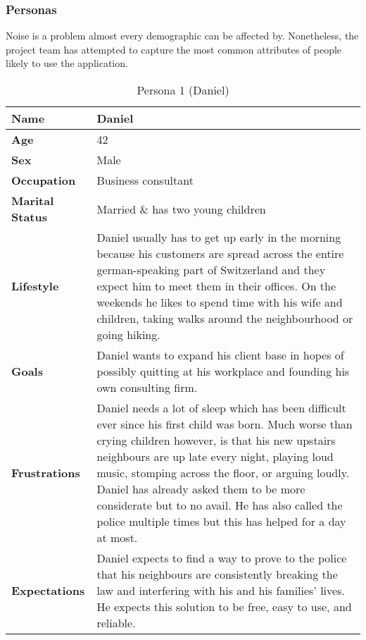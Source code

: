 \subsubsection{Personas}
\label{subsubsec:personas}
Noise is a problem almost every demographic can be affected by. Nonetheless, the project team has attempted to capture the most common attributes of people
likely to use the application. \\
\begin{table}
    \centering
    \begin{tabularx}{\textwidth}{|l|X|}
        \hline
        \textbf{Name} & Daniel \\
        \hline
        \textbf{Age} & 42 \\
        \hline
        \textbf{Sex} & Male \\
        \hline
        \textbf{Occupation} & Business consultant \\
        \hline
        \textbf{Marital Status} & Married \& has two young children \\
        \hline
        \textbf{Lifestyle} & Daniel usually has to get up early in the morning because his
        customers are spread across the entire german-speaking part of Switzerland and they expect him to meet them in their offices.
        On the weekends he likes to spend time with his wife and children, taking walks around the neighbourhood or going hiking. \\
        \hline
        \textbf{Goals} & Daniel wants to expand his client base in hopes of possibly quitting at his workplace and founding his own consulting firm. \\
        \hline
        \textbf{Frustrations} & Daniel needs a lot of sleep which has been difficult ever since his first child was born.
        Much worse than crying children however, is that his new upstairs neighbours are up late every night, playing loud music,
        stomping across the floor, or arguing loudly. Daniel has already asked them to be more considerate but to no avail. He has also
        called the police multiple times but this has helped for a day at most. \\
        \hline
        \textbf{Expectations} & Daniel expects to find a way to prove to the police that his neighbours are consistently
        breaking the law and interfering with his and his families' lives. He expects this solution to be free, easy to use, and reliable. \\
        \hline
    \end{tabularx}
    \caption{Persona 1 (Daniel)}
    \label{table:persona1}
\end{table}

